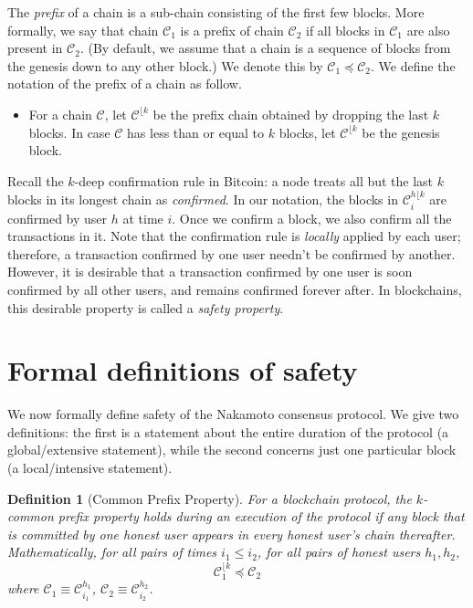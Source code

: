 \documentclass{article}
\newtheorem{definition}{Definition}
\begin{document}
The \textit{prefix} of a chain is a sub-chain consisting of the first few blocks. More formally, we say that chain $\mathcal{C}_1$ is a prefix of chain $\mathcal{C}_2$ if all blocks in $\mathcal{C}_1$ are also present in $\mathcal{C}_2$. (By default, we assume that a chain is a sequence of blocks from the genesis down to any other block.) We denote this by $\mathcal{C}_1 \preceq \mathcal{C}_2$. We define the notation of the prefix of a chain as follow.
\begin{itemize}
    \item For a chain $\mathcal{C}$, let $\mathcal{C}^{\lfloor k}$ be the  prefix chain obtained by dropping the last $k$ blocks. In case $\mathcal{C}$ has less than or equal to $k$ blocks, let $\mathcal{C}^{\lfloor k}$ be the genesis block.
\end{itemize}

Recall the $k$-deep confirmation rule in Bitcoin: a node treats all but the last $k$ blocks in its longest chain as \textit{confirmed}. In our notation, the blocks in  $\mathcal{C}^{h \lfloor k}_i$ are confirmed by user $h$ at time $i$. %
Once we confirm a block, we also confirm all the transactions in it. Note that the confirmation rule is \textit{locally} applied by each user; therefore, a transaction confirmed by one user needn't be confirmed by another. However, it is desirable that a transaction confirmed by one user is soon confirmed by all other users, and remains confirmed forever after. In blockchains, this desirable property is called a \textit{safety property}.

\section*{Formal definitions of safety}
We now formally define safety of the Nakamoto consensus protocol. We give two definitions: the first is a statement about the entire duration of the protocol (a global/extensive statement), while the second concerns just one particular block (a local/intensive statement). 

\begin{definition}[Common Prefix Property]
For a blockchain protocol, the $k$-common prefix property holds during an execution of the protocol if any block that is committed by one honest user appears in every honest user's chain thereafter.
Mathematically, for all pairs of times $i_1 \leq i_2$, for all pairs of honest users $h_1, h_2$, 
\[\mathcal{C}^{\lfloor k}_1 \preceq \mathcal{C}_2\]
where $\mathcal{C}_1 \equiv \mathcal{C}^{h_1}_{i_1}$, $\mathcal{C}_2 \equiv \mathcal{C}^{h_2}_{i_2}$.
\end{definition}
\end{document}
